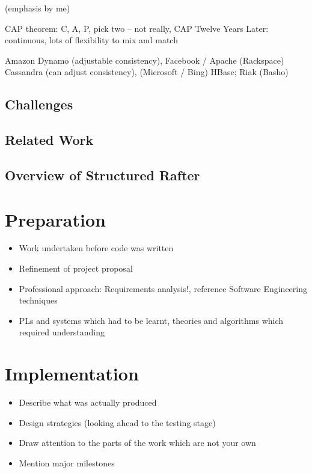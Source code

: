\documentclass[11pt,chapterprefix=true,toc=bibliography,numbers=noendperiod]{scrreprt}
\begin{document}
(emphasis by me)

CAP theorem: C, A, P, pick two -- not really, CAP Twelve Years Later: continuous, lots of flexibility to mix and match \parencite{cap12} \parencite{cap}

Amazon Dynamo (adjustable consistency), Facebook / Apache (Rackspace) Cassandra (can adjust consistency), (Microsoft / Bing) HBase; Riak (Basho)

\section{Challenges\label{sc:challenges}}

\section{Related Work\label{sc:related-work}}

\section{Overview of Structured Rafter\label{sc:overview-of-structured-rafter}}

\chapter{Preparation\label{ch:preparation}}

\begin{itemize}
    \item Work undertaken before code was written
    \item Refinement of project proposal
    \item Professional approach: Requirements analysis!, reference Software Engineering techniques
    \item PLs and systems which had to be learnt, theories and algorithms which required understanding
\end{itemize}

\chapter{Implementation\label{ch:implementation}}

\begin{itemize}
    \item Describe what was actually produced
    \item Design strategies (looking ahead to the testing stage)
    \item Draw attention to the parts of the work which are not your own
    \item Mention major milestones
\end{itemize}
\end{document}
